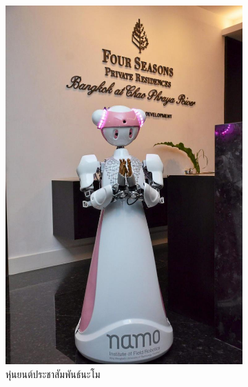 \begin{figure}[!ht]
    \centering
    \begin{subfigure}[b]{0.3\textwidth}
        \centering
        \includegraphics[width=\textwidth]{chapter2/images/namo.jpg}
        \caption{หุ่นยนต์ประชาสัมพันธ์นะโม}
        \label{fig:namo}
    \end{subfigure}
    \hfill
    \begin{subfigure}[b]{0.3\textwidth}
        \centering

\end{subfigure}
\end{figure}

